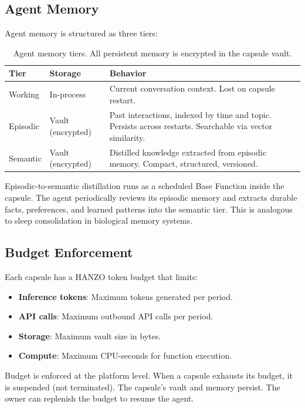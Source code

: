 \documentclass[11pt]{article}
\begin{document}
\subsection{Agent Memory}

Agent memory is structured as three tiers:

\begin{table}[H]
\centering
\small
\begin{tabular}{llp{5cm}}
\toprule
\textbf{Tier} & \textbf{Storage} & \textbf{Behavior} \\
\midrule
Working & In-process & Current conversation context. Lost on capsule
restart. \\
Episodic & Vault (encrypted) & Past interactions, indexed by time and topic.
Persists across restarts. Searchable via vector similarity. \\
Semantic & Vault (encrypted) & Distilled knowledge extracted from episodic
memory. Compact, structured, versioned. \\
\bottomrule
\end{tabular}
\caption{Agent memory tiers. All persistent memory is encrypted in the
capsule vault.}
\label{tab:memory}
\end{table}

Episodic-to-semantic distillation runs as a scheduled Base Function inside the
capsule. The agent periodically reviews its episodic memory and extracts
durable facts, preferences, and learned patterns into the semantic tier. This
is analogous to sleep consolidation in biological memory systems.

\subsection{Budget Enforcement}

Each capsule has a HANZO token budget that limits:

\begin{itemize}[leftmargin=1.1em]
    \item \textbf{Inference tokens}: Maximum tokens generated per period.
    \item \textbf{API calls}: Maximum outbound API calls per period.
    \item \textbf{Storage}: Maximum vault size in bytes.
    \item \textbf{Compute}: Maximum CPU-seconds for function execution.
\end{itemize}

Budget is enforced at the platform level. When a capsule exhausts its budget,
it is suspended (not terminated). The capsule's vault and memory persist.
The owner can replenish the budget to resume the agent.
\end{document}
